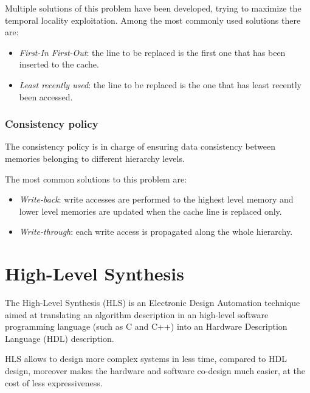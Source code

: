 \documentclass[11pt,a4paper]{memoir}
\begin{document}
Multiple solutions of this problem have been developed, trying to maximize
the temporal locality exploitation.
Among the most commonly used solutions there are:
\begin{itemize}
	\item \emph{First-In First-Out}: the line to be replaced is the first
		one that has been inserted to the cache.
	\item \emph{Least recently used}: the line to be replaced is the one
		that has least recently been accessed.
\end{itemize}

\subsubsection{Consistency policy}
The consistency policy is in charge of ensuring data consistency between memories
belonging to different hierarchy levels.

The most common solutions to this problem are:
\begin{itemize}
	\item \emph{Write-back}: write accesses are performed to the highest
		level memory and lower level memories are updated when the cache
		line is replaced only.
	\item \emph{Write-through}: each write access is propagated along the
		whole hierarchy.
\end{itemize}

\section{High-Level Synthesis}
The High-Level Synthesis (HLS) is an Electronic Design Automation technique
aimed at translating an algorithm description in an high-level software
programming language (such as C and C++) into an Hardware Description Language
(HDL) description.

HLS allows to design more complex systems in less time, compared to HDL design,
moreover makes the hardware and software co-design much easier, at the cost of
less expressiveness.
\end{document}
